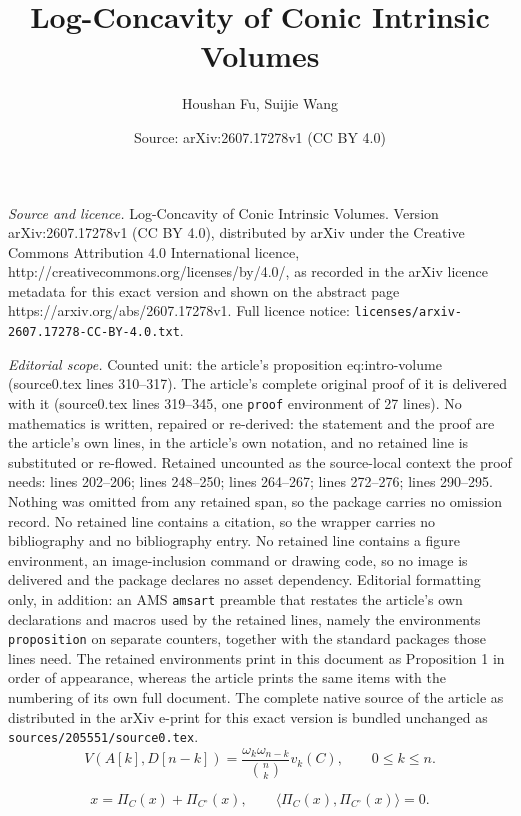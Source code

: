 \documentclass[10pt,a4paper]{amsart}
\title{Log-Concavity of Conic Intrinsic Volumes}
\author{Houshan Fu, Suijie Wang}
\date{Source: arXiv:2607.17278v1 (CC BY 4.0)}
\begin{document}
\maketitle

\noindent\emph{Source and licence.} Log-Concavity of Conic Intrinsic Volumes. Version arXiv:2607.17278v1 (CC BY 4.0), distributed by arXiv under the Creative Commons Attribution 4.0 International licence, http://creativecommons.org/licenses/by/4.0/, as recorded in the arXiv licence metadata for this exact version and shown on the abstract page https://arxiv.org/abs/2607.17278v1. Full licence notice: \texttt{licenses/arxiv-2607.17278-CC-BY-4.0.txt}.\par\smallskip

\noindent\textit{Editorial scope.} Counted unit: the article's proposition eq:intro-volume (source0.tex lines 310--317). The article's complete original proof of it is delivered with it (source0.tex lines 319--345, one \texttt{proof} environment of 27 lines). No mathematics is written, repaired or re-derived: the statement and the proof are the article's own lines, in the article's own notation, and no retained line is substituted or re-flowed.  Retained uncounted as the source-local context the proof needs: lines 202--206; lines 248--250; lines 264--267; lines 272--276; lines 290--295.  Nothing was omitted from any retained span, so the package carries no omission record.  No retained line contains a citation, so the wrapper carries no bibliography and no bibliography entry.  No retained line contains a figure environment, an image-inclusion command or drawing code, so no image is delivered and the package declares no asset dependency.  Editorial formatting only, in addition: an AMS \texttt{amsart} preamble that restates the article's own declarations and macros used by the retained lines, namely the environments \texttt{proposition} on separate counters, together with the standard packages those lines need.  The retained environments print in this document as Proposition 1 in order of appearance, whereas the article prints the same items with the numbering of its own full document.  The complete native source of the article as distributed in the arXiv e-print for this exact version is bundled unchanged as \texttt{sources/205551/source0.tex}.
\begin{equation}\label{eq:intro-mixed}
 V(A[k],D[n-k])
 =\frac{\omega_k\omega_{n-k}}{\binom nk}v_k(C),
 \qquad 0\le k\le n.
\end{equation}

\begin{equation}\label{eq:moreau}
 x=\Pi_C(x)+\Pi_{C^\circ}(x),\qquad\langle\Pi_C(x),\Pi_{C^\circ}(x)\rangle=0.
\end{equation}
\end{document}
